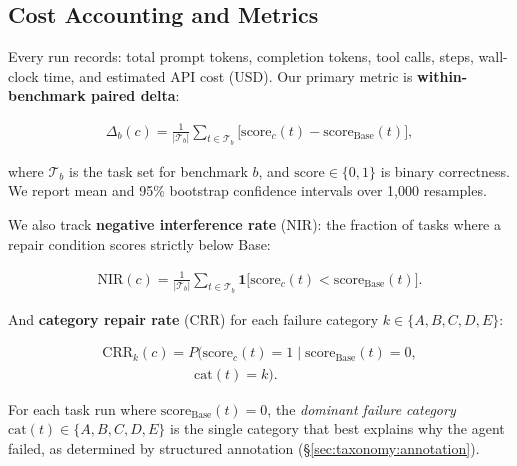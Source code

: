 
\subsection{Cost Accounting and Metrics}
\label{sec:harness:metrics}

Every run records: total prompt tokens, completion tokens, tool calls, steps, wall-clock time, and estimated API cost (USD). Our primary metric is \textbf{within-benchmark paired delta}:

\begin{align}
  \Delta_b(c) = \frac{1}{|\mathcal{T}_b|}\sum_{t\in\mathcal{T}_b}\bigl[\mathrm{score}_c(t) - \mathrm{score}_{\mathrm{Base}}(t)\bigr],
  \label{eq:paired-delta}
\end{align}

where $\mathcal{T}_b$ is the task set for benchmark $b$, and $\mathrm{score} \in \{0, 1\}$ is binary correctness. We report mean and 95\% bootstrap confidence intervals over 1,000 resamples.

We also track \textbf{negative interference rate} (NIR): the fraction of tasks where a repair condition scores strictly below Base:

\begin{align}
  \mathrm{NIR}(c) = \frac{1}{|\mathcal{T}_b|}\sum_{t\in\mathcal{T}_b} \mathbf{1}\bigl[\mathrm{score}_c(t) < \mathrm{score}_{\mathrm{Base}}(t)\bigr].
  \label{eq:nir}
\end{align}

And \textbf{category repair rate} (CRR) for each failure category $k \in \{A, B, C, D, E\}$:

\begin{align}
  \mathrm{CRR}_k(c) = P\bigl(\mathrm{score}_c(t) = 1 \mid \mathrm{score}_{\mathrm{Base}}(t) = 0, \\
  \qquad\qquad\qquad\;\; \mathrm{cat}(t) = k\bigr).
  \label{eq:crr}
\end{align}

\begin{definit}\label{def:failure-category}
For each task run where $\mathrm{score}_{\mathrm{Base}}(t) = 0$, the \emph{dominant failure category} $\mathrm{cat}(t) \in \{A, B, C, D, E\}$ is the single category that best explains why the agent failed, as determined by structured annotation (\S\ref{sec:taxonomy:annotation}).
\end{definit}
